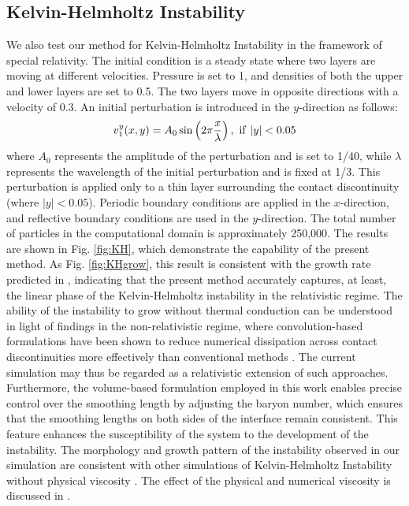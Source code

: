 \documentclass[]{aastex631}
\begin{document}
\subsection{Kelvin-Helmholtz Instability}
We also test our method for Kelvin-Helmholtz Instability in the framework of special relativity. 
The initial condition is a steady state where two layers are moving at different velocities.
Pressure is set to 1, and densities of both the upper and lower layers are set to 0.5. 
The two layers move in opposite directions with a velocity of 0.3.
An initial perturbation is introduced in the $y$-direction as follows: 
\begin{align}
    v^y_{1}(x,y) = A_0 \sin \left( 2\pi\frac{x}{\lambda} \right),\ {\rm if}\ |y|<0.05
\end{align}
where 
$A_0$ represents the amplitude of the perturbation and is set to 1/40, while 
$\lambda$ represents the wavelength of the initial perturbation and is fixed at 1/3.
This perturbation is applied only to a thin layer surrounding the contact discontinuity (where $|y|<0.05$).
Periodic boundary conditions are applied in the $x$-direction, and reflective boundary conditions are used in the $y$-direction.
The total number of particles in the computational domain is approximately 250,000.
The results are shown in Fig. \ref{fig:KH}, which demonstrate the capability of the present method.
As Fig. \ref{fig:KHgrow}, this result is consistent with the growth rate predicted in \citep{Bodo&Rosner_2004}, indicating that the present method accurately captures, at least, the linear phase of the Kelvin-Helmholtz instability in the relativistic regime.
The ability of the instability to grow without thermal conduction can be understood in light of findings in the non-relativistic regime, where convolution-based formulations have been shown to reduce numerical dissipation across contact discontinuities more effectively than conventional methods \citep{Cha+2010}.
The current simulation may thus be regarded as a relativistic extension of such approaches.
Furthermore, the volume-based formulation employed in this work enables precise control over the smoothing length by adjusting the baryon number, which ensures that the smoothing lengths on both sides of the interface remain consistent.
This feature enhances the susceptibility of the system to the development of the instability.
The morphology and growth pattern of the instability observed in our simulation are consistent with other simulations of Kelvin-Helmholtz Instability without physical viscosity \citep[e.g.,][]{Duffell+2011}.
The effect of the physical and numerical viscosity is discussed in \citet{Townsend+2022}.   
\end{document}
